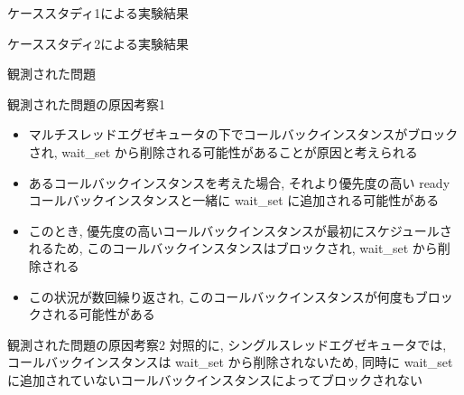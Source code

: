 \begin{frame}{ケーススタディ1による実験結果}
\end{frame}

\begin{frame}{ケーススタディ2による実験結果}
\end{frame}

\begin{frame}{観測された問題}
\end{frame}

\begin{frame}{観測された問題の原因考察1}
    \begin{itemize}
        \item マルチスレッドエグゼキュータの下でコールバックインスタンスがブロックされ, wait\_set から削除される可能性があることが原因と考えられる
        \item あるコールバックインスタンスを考えた場合, それより優先度の高い ready コールバックインスタンスと一緒に wait\_set に追加される可能性がある
        \item このとき, 優先度の高いコールバックインスタンスが最初にスケジュールされるため, このコールバックインスタンスはブロックされ, wait\_set から削除される
        \item この状況が数回繰り返され, このコールバックインスタンスが何度もブロックされる可能性がある
    \end{itemize}
\end{frame}

\begin{frame}{観測された問題の原因考察2}
    対照的に, シングルスレッドエグゼキュータでは, コールバックインスタンスは wait\_set から削除されないため, 同時に wait\_set に追加されていないコールバックインスタンスによってブロックされない
\end{frame}

